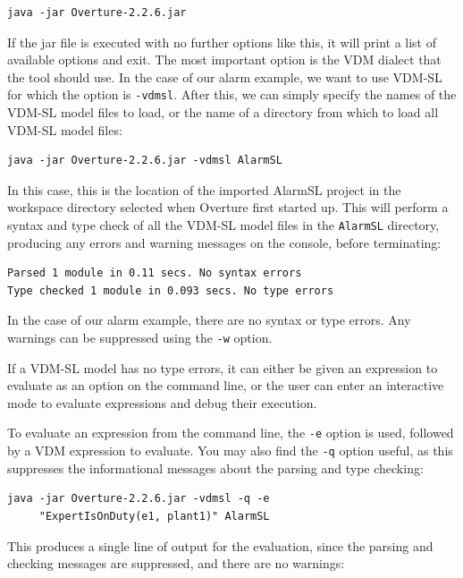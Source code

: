 \lstset{style=tool,language=}
\begin{lstlisting}
java -jar Overture-2.2.6.jar
\end{lstlisting}

\noindent If the jar file is executed with no further options like this, it will print a list of available options and exit. The most important option is the VDM dialect that the tool should use. In the
case of our alarm example, we want to use VDM-SL for which the option is \verb|-vdmsl|. After this, we can simply specify the names of the VDM-SL model files to load, or the name of a directory from which to
load all VDM-SL model files:

\begin{lstlisting}
java -jar Overture-2.2.6.jar -vdmsl AlarmSL
\end{lstlisting}

\noindent In this case, this is the location of the imported AlarmSL project in the workspace directory selected when Overture first started up.  This will perform a syntax and type check of all the VDM-SL model files in the \texttt{AlarmSL} directory, producing any errors and warning messages on the console, before terminating:

\begin{lstlisting}[style=mystyle]
Parsed 1 module in 0.11 secs. No syntax errors
Type checked 1 module in 0.093 secs. No type errors
\end{lstlisting}

\noindent In the case of our alarm example, there are no syntax or type errors. Any warnings can be suppressed using the \verb|-w| option.

If a VDM-SL model has no type errors, it can either be given an expression to evaluate as an option on the command line, or the user can enter an interactive mode to evaluate expressions and debug their execution.

To evaluate an expression from the command line, the \verb|-e| option is used, followed by a VDM expression to evaluate. You may also find the \verb|-q| option useful, as this suppresses the informational messages about the parsing and type checking:

\begin{lstlisting}[style=tool]
java -jar Overture-2.2.6.jar -vdmsl -q -e 
     "ExpertIsOnDuty(e1, plant1)" AlarmSL
\end{lstlisting}

\noindent This produces a single line of output for the evaluation, since the parsing and checking messages are suppressed, and there are no warnings:

